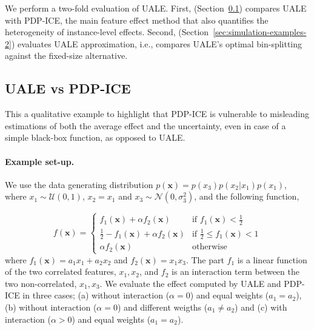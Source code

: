 \documentclass[twoside]{article}
\begin{document}
We perform a two-fold evaluation of UALE. First,
(Section~\ref{sec:simulation-examples-1}) compares UALE with PDP-ICE,
the main feature effect method that also quantifies the heterogeneity
of instance-level effects. Second,
(Section~\ref{sec:simulation-examples-2}) evaluates UALE
approximation, i.e., compares UALE's optimal bin-splitting against the
fixed-size alternative.

\subsection{UALE vs PDP-ICE}
\label{sec:simulation-examples-1}

This a qualitative example to highlight that PDP-ICE is vulnerable to
misleading estimations of both the average effect and the uncertainty,
even in case of a simple black-box function, as opposed to UALE.

\paragraph{Example set-up.}
We use the data generating distribution
\(p(\mathbf{x}) = p(x_3)p(x_2|x_1)p(x_1)\), where
\(x_1 \sim \mathcal{U}(0,1)\), \(x_2 = x_1\) and
\(x_3 \sim \mathcal{N}(0, \sigma_3^2)\), and the following function,

\begin{equation}
  \label{eq:synth-ex-1-function}
  f(\mathbf{x}) = \begin{cases}
                    f_1(\mathbf{x}) + \alpha f_2(\mathbf{x}) & \text{if $f_1(\mathbf{x}) < \frac{1}{2}$ }\\
                    \frac{1}{2} - f_1(\mathbf{x}) + \alpha f_2(\mathbf{x}) & \text{if $\frac{1}{2} \leq f_1(\mathbf{x}) < 1$}\\
                    \alpha f_2(\mathbf{x}) &\text{otherwise}
                  \end{cases}
\end{equation}
%
where \(f_1(\mathbf{x}) = a_1 x_1 + a_2 x_2\) and
\(f_2(\mathbf{x}) = x_1x_3\). The part \(f_1\) is a linear function of
the two correlated features, \(x_1, x_2\), and \(f_2\) is an
interaction term between the two non-correlated, \(x_1, x_3\).  We
evaluate the effect computed by UALE and PDP-ICE in three cases; (a)
without interaction (\(\alpha=0\)) and equal weights (\(a_1=a_2\)),
(b) without interaction (\(\alpha=0\)) and different weigths
(\( a_1 \neq a_2 \)) and (c) with interaction (\(\alpha > 0\)) and
equal weights (\(a_1=a_2\)).
\end{document}

